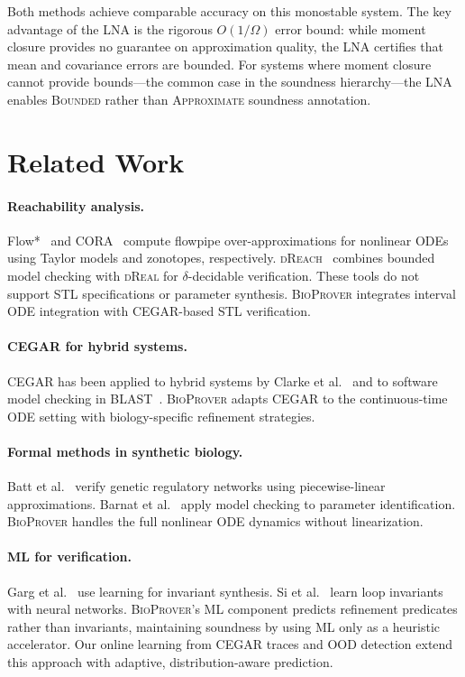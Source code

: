 \documentclass[11pt]{article}
\newcommand{\bioprover}{\textsc{BioProver}}
\newcommand{\cegar}{\textsc{CEGAR}}
\newcommand{\dreach}{\textsc{dReach}}
\newcommand{\dreal}{\textsc{dReal}}
\newcommand{\stl}{\textsc{STL}}
\begin{document}
Both methods achieve comparable accuracy on this monostable system.
The key advantage of the LNA is the rigorous $O(1/\Omega)$ error
bound: while moment closure provides no guarantee on approximation
quality, the LNA certifies that mean and covariance errors are
bounded. For systems where moment closure cannot provide
bounds---the common case in the soundness hierarchy---the LNA
enables \textsc{Bounded} rather than \textsc{Approximate} soundness
annotation.

\section{Related Work}
\label{sec:related}

\paragraph{Reachability analysis.}
Flow*~\cite{chen2013flow} and CORA~\cite{althoff2015cora} compute
flowpipe over-approximations for nonlinear ODEs using Taylor models
and zonotopes, respectively. \dreach{}~\cite{kong2015dreach}
combines bounded model checking with \dreal{} for
$\delta$-decidable verification. These tools do not support \stl{}
specifications or parameter synthesis. \bioprover{} integrates
interval ODE integration with \cegar{}-based \stl{} verification.

\paragraph{CEGAR for hybrid systems.}
\cegar{} has been applied to hybrid systems by Clarke et
al.~\cite{clarke2003verification} and to software model checking in
BLAST~\cite{beyer2007configurable}. \bioprover{} adapts \cegar{} to
the continuous-time ODE setting with biology-specific refinement
strategies.

\paragraph{Formal methods in synthetic biology.}
Batt et al.~\cite{batt2007genetic} verify genetic regulatory networks
using piecewise-linear approximations. Barnat et
al.~\cite{barnat2009parameter} apply model checking to parameter
identification. \bioprover{} handles the full nonlinear ODE dynamics
without linearization.

\paragraph{ML for verification.}
Garg et al.~\cite{garg2014ice} use learning for invariant synthesis.
Si et al.~\cite{si2018learning} learn loop invariants with neural
networks. \bioprover{}'s ML component predicts refinement predicates
rather than invariants, maintaining soundness by using ML only as a
heuristic accelerator. Our online learning from \cegar{} traces and
OOD detection extend this approach with adaptive, distribution-aware
prediction.
\end{document}
